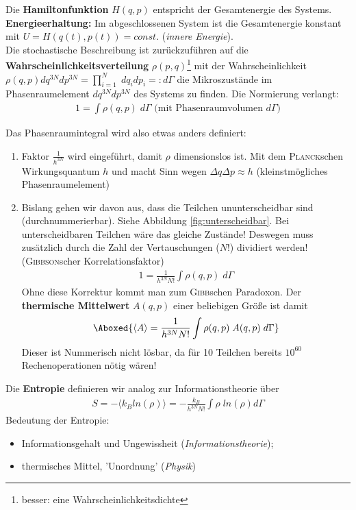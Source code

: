 \documentclass[12pt]{article}
\begin{document}
Die \textbf{Hamiltonfunktion} $H(q,p)$ entspricht der Gesamtenergie des Systems. \textbf{Energieerhaltung:} Im abgeschlossenen System ist die Gesamtenergie konstant mit $U = H (q (t), p(t)) = const.$ (\textit{innere Energie}). \\
Die stochastische Beschreibung ist zurückzuführen auf die \textbf{Wahrscheinlichkeitsverteilung} $\rho (p,q)$\footnote{ besser: eine Wahrscheinlichkeitsdichte} mit der Wahrscheinlichkeit $\rho (q,p) dq^{3N} dp	^{3N}= \prod_{i=1}^{N} \; dq_i dp_i =: d\Gamma $  die Mikroszustände im Phasenraumelement $dq^{3N} dp^{3N} $ des Systems zu finden. Die Normierung verlangt: 
\begin{align}
1 = \int \rho (q,p) \; d\Gamma \mbox{ (mit Phasenraumvolumen } d\Gamma)
\end{align}

Das Phasenraumintegral wird also etwas anders definiert:
\begin{enumerate}
\item Faktor $\frac{1}{h^{3N}}$ wird eingeführt, damit $\rho $ dimensionslos ist. Mit dem \textsc{Planck}schen Wirkungsquantum $h$ und macht Sinn wegen $\Delta q \Delta p \approx h$ (kleinstmögliches Phasenraumelement)
\item Bislang gehen wir davon aus, dass die Teilchen ununterscheidbar sind (durchnummerierbar). Siehe Abbildung \ref{fig:unterscheidbar}. Bei unterscheidbaren Teilchen wäre das gleiche Zustände! Deswegen muss zusätzlich durch die Zahl der Vertauschungen ($N! $) dividiert werden! (\textsc{Gibbson}scher Korrelationsfaktor)
\begin{align}
1 = \frac{1}{h^{3N} N!} \int \rho (q,p)\;  d\Gamma
\end{align}
Ohne diese Korrektur kommt man zum \textsc{Gibb}schen Paradoxon. Der \textbf{thermische Mittelwert} $A(q,p)$ einer beliebigen Größe ist damit
\begin{align}
\Aboxed{ \langle A \rangle = \frac{1}{h^{3N} N!} \int \rho (q,p)\; A(q,p) \;  d\Gamma }
\end{align}
Dieser ist Nummerisch nicht lösbar, da für 10 Teilchen bereits $10^{60}$ Rechenoperationen nötig wären! 
\end{enumerate}
Die \textbf{Entropie} definieren wir analog zur Informationstheorie über 
\begin{align}
S = - \langle k_B ln(\rho ) \rangle  = -\frac{k_B}{h^{3N} N!} \int \rho \; ln(\rho ) d\Gamma 
\end{align}
Bedeutung der Entropie: 
\begin{itemize}
\item Informationsgehalt und Ungewissheit (\textit{Informationstheorie});
\item  thermisches Mittel, 'Unordnung' (\textit{Physik})
\end{itemize}  
\end{document}
